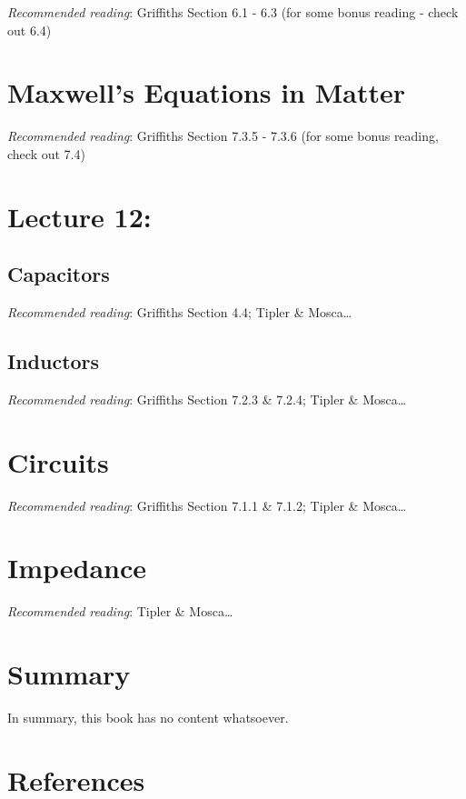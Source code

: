 \documentclass[
  letterpaper,
  DIV=11,
  numbers=noendperiod]{scrreprt}
\newlength{\cslhangindent}
\newenvironment{CSLReferences}[2] %
 {\begin{list}{}{%
  \setlength{\itemindent}{0pt}
  \setlength{\leftmargin}{0pt}
  \setlength{\parsep}{0pt}
  \ifodd #1
   \setlength{\leftmargin}{\cslhangindent}
   \setlength{\itemindent}{-1\cslhangindent}
  \fi
  \setlength{\itemsep}{#2\baselineskip}}}
 {\end{list}}
\begin{document}
\emph{Recommended reading}: Griffiths Section 6.1 - 6.3 (for some bonus
reading - check out 6.4)


\chapter{Maxwell's Equations in
Matter}\label{maxwells-equations-in-matter}

\emph{Recommended reading}: Griffiths Section 7.3.5 - 7.3.6 (for some
bonus reading, check out 7.4)


\chapter{Lecture 12:}\label{lecture-12}

\section{Capacitors}\label{capacitors}

\emph{Recommended reading}: Griffiths Section 4.4; Tipler \&
Mosca\ldots{}

\section{Inductors}\label{inductors}

\emph{Recommended reading}: Griffiths Section 7.2.3 \& 7.2.4; Tipler \&
Mosca\ldots{}


\chapter{Circuits}\label{circuits}

\emph{Recommended reading}: Griffiths Section 7.1.1 \& 7.1.2; Tipler \&
Mosca\ldots{}


\chapter{Impedance}\label{impedance}

\emph{Recommended reading}: Tipler \& Mosca\ldots{}


\chapter{Summary}\label{summary-2}

In summary, this book has no content whatsoever.


\chapter*{References}\label{references}


\label{refs}
\begin{CSLReferences}{0}{1}
\end{CSLReferences}
\end{document}
